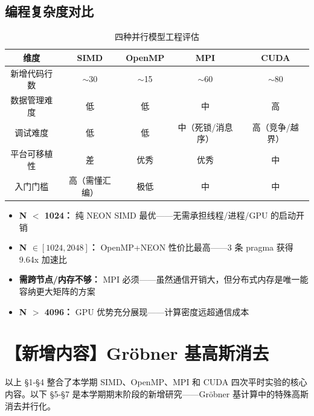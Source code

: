 \documentclass[a4paper]{article}
\begin{document}
\subsection{编程复杂度对比}

\begin{table}[H]
  \centering
  \caption{四种并行模型工程评估}
  \begin{tabular}{|c|c|c|c|c|}
  \hline
  \textbf{维度} & \textbf{SIMD} & \textbf{OpenMP} & \textbf{MPI} & \textbf{CUDA} \\
  \hline
  新增代码行数 & $\sim$30 & $\sim$15 & $\sim$60 & $\sim$80 \\
  数据管理难度 & 低 & 低 & 中 & 高 \\
  调试难度 & 低 & 低 & 中（死锁/消息序） & 高（竞争/越界） \\
  平台可移植性 & 差 & 优秀 & 优秀 & 中 \\
  入门门槛 & 高（需懂汇编） & 极低 & 中 & 中 \\
  \hline
  \end{tabular}
\end{table}

\begin{itemize}
    \item \textbf{N $<$ 1024：} 纯 NEON SIMD 最优——无需承担线程/进程/GPU 的启动开销
    \item \textbf{N $\in [1024, 2048]$：} OpenMP+NEON 性价比最高——3 条 pragma 获得 9.64x 加速比
    \item \textbf{需跨节点/内存不够：} MPI 必须——虽然通信开销大，但分布式内存是唯一能容纳更大矩阵的方案
    \item \textbf{N $>$ 4096：} GPU 优势充分展现——计算密度远超通信成本
\end{itemize}

\newpage
\section{【新增内容】Gröbner 基高斯消去}

以上 §1-§4 整合了本学期 SIMD、OpenMP、MPI 和 CUDA 四次平时实验的核心内容。以下 §5-§7 是本学期期末阶段的新增研究——Gröbner 基计算中的特殊高斯消去并行化。
\end{document}
